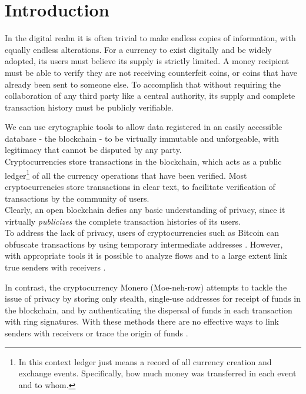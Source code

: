 \chapter{Introduction}
\label{chap:introduction}

In the digital realm it is often trivial to make endless copies of information, with equally endless alterations. For a currency to exist digitally and be widely adopted, its users must believe its supply is strictly limited. A money recipient must be able to verify they are not receiving counterfeit coins, or coins that have already been sent to someone else. To accomplish that without requiring the collaboration of any third party like a central authority, its supply and complete transaction history must be publicly verifiable.

We can use crytographic tools to allow data registered in an easily accessible database - the blockchain - to be virtually immutable and unforgeable, with legitimacy that cannot be disputed by any party.
\\ \newline
Cryptocurrencies store transactions in the blockchain, which acts as a public ledger\footnote{In this context ledger just means a record of all currency creation and exchange events. Specifically, how much money was transferred in each event and to whom.} of all the currency operations that have been verified. Most cryptocurrencies store transactions in clear text, to facilitate verification of transactions by the community of users.
\\ \newline
Clearly, an open blockchain defies any basic understanding of privacy, since it virtually {\em publicizes} the complete transaction histories of its users.
\\ \newline
To address the lack of privacy, users of cryptocurrencies such as Bitcoin can obfuscate transactions by using temporary intermediate addresses \cite{DBLP:journals/corr/NarayananM17}. However, with appropriate tools it is possible to analyze flows and to a large extent link true senders with receivers \cite{DBLP:journals/corr/ShenTuY15b, DK-police-tracing-btc, Andrew-Cox-Sandia}.

In contrast, the cryptocurrency Monero (Moe-neh-row) attempts to tackle the issue of privacy by storing only stealth, single-use addresses for receipt of funds in the blockchain, and by authenticating the dispersal of funds in each transaction with ring signatures. With these methods there are no effective ways to link senders with receivers or trace the origin of funds \cite{Monero-intro}.

